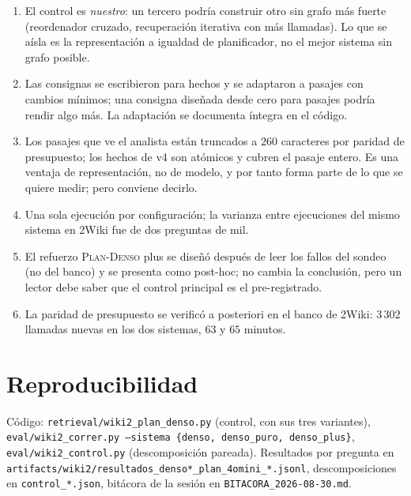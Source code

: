 \documentclass[11pt,a4paper]{article}
\newcommand{\ctrl}{\textsc{Plan-Denso}}
\begin{document}
\begin{enumerate}[leftmargin=1.6em, itemsep=1pt]
\item El control es \emph{nuestro}: un tercero podría construir otro sin
  grafo más fuerte (reordenador cruzado, recuperación iterativa con más
  llamadas). Lo que se aísla es la representación a igualdad de
  planificador, no el mejor sistema sin grafo posible.
\item Las consignas se escribieron para hechos y se adaptaron a pasajes con
  cambios mínimos; una consigna diseñada desde cero para pasajes podría
  rendir algo más. La adaptación se documenta íntegra en el código.
\item Los pasajes que ve el analista están truncados a $260$ caracteres por
  paridad de presupuesto; los hechos de v4 son atómicos y cubren el pasaje
  entero. Es una ventaja de representación, no de modelo, y por tanto forma
  parte de lo que se quiere medir; pero conviene decirlo.
\item Una sola ejecución por configuración; la varianza entre ejecuciones
  del mismo sistema en 2Wiki fue de dos preguntas de mil.
\item El refuerzo \ctrl{} plus se diseñó después de leer los fallos del
  sondeo (no del banco) y se presenta como post-hoc; no cambia la
  conclusión, pero un lector debe saber que el control principal es el
  pre-registrado.
\item La paridad de presupuesto se verificó a posteriori en el banco de
  2Wiki: $3\,302$ llamadas nuevas en los dos sistemas, $63$ y $65$ minutos.
\end{enumerate}

\section*{Reproducibilidad}

Código: \texttt{retrieval/wiki2\_plan\_denso.py} (control, con sus tres
variantes), \texttt{eval/wiki2\_correr.py --sistema \{denso, denso\_puro,
denso\_plus\}}, \texttt{eval/wiki2\_control.py} (descomposición pareada).
Resultados por pregunta en \texttt{artifacts/wiki2/resultados\_denso*\_plan\_4omini\_*.jsonl},
descomposiciones en \texttt{control\_*.json}, bitácora de la sesión en
\texttt{BITACORA\_2026-08-30.md}.
\end{document}
